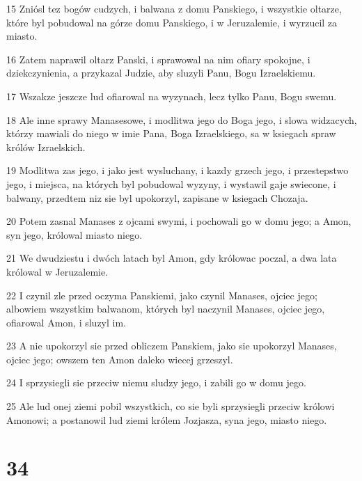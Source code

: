 \par 15 Zniósl tez bogów cudzych, i balwana z domu Panskiego, i wszystkie oltarze, które byl pobudowal na górze domu Panskiego, i w Jeruzalemie, i wyrzucil za miasto.
\par 16 Zatem naprawil oltarz Panski, i sprawowal na nim ofiary spokojne, i dziekczynienia, a przykazal Judzie, aby sluzyli Panu, Bogu Izraelskiemu.
\par 17 Wszakze jeszcze lud ofiarowal na wyzynach, lecz tylko Panu, Bogu swemu.
\par 18 Ale inne sprawy Manasesowe, i modlitwa jego do Boga jego, i slowa widzacych, którzy mawiali do niego w imie Pana, Boga Izraelskiego, sa w ksiegach spraw królów Izraelskich.
\par 19 Modlitwa zas jego, i jako jest wysluchany, i kazdy grzech jego, i przestepstwo jego, i miejsca, na których byl pobudowal wyzyny, i wystawil gaje swiecone, i balwany, przedtem niz sie byl upokorzyl, zapisane w ksiegach Chozaja.
\par 20 Potem zasnal Manases z ojcami swymi, i pochowali go w domu jego; a Amon, syn jego, królowal miasto niego.
\par 21 We dwudziestu i dwóch latach byl Amon, gdy królowac poczal, a dwa lata królowal w Jeruzalemie.
\par 22 I czynil zle przed oczyma Panskiemi, jako czynil Manases, ojciec jego; albowiem wszystkim balwanom, których byl naczynil Manases, ojciec jego, ofiarowal Amon, i sluzyl im.
\par 23 A nie upokorzyl sie przed obliczem Panskiem, jako sie upokorzyl Manases, ojciec jego; owszem ten Amon daleko wiecej grzeszyl.
\par 24 I sprzysiegli sie przeciw niemu sludzy jego, i zabili go w domu jego.
\par 25 Ale lud onej ziemi pobil wszystkich, co sie byli sprzysiegli przeciw królowi Amonowi; a postanowil lud ziemi królem Jozjasza, syna jego, miasto niego.

\chapter{34}

